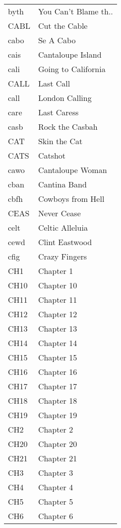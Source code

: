 \begin{supertabular}{ll}
 byth &  You Can't Blame th.. \\
 CABL &         Cut the Cable \\
 cabo &             Se A Cabo \\
 cais &     Cantaloupe Island \\
 cali &   Going to California \\
 CALL &             Last Call \\
 call &        London Calling \\
 care &           Last Caress \\
 casb &       Rock the Casbah \\
  CAT &          Skin the Cat \\
 CATS &               Catshot \\
 cawo &      Cantaloupe Woman \\
 cban &          Cantina Band \\
 cbfh &     Cowboys from Hell \\
 CEAS &           Never Cease \\
 celt &       Celtic Alleluia \\
 cewd &        Clint Eastwood \\
 cfig &         Crazy Fingers \\
  CH1 &             Chapter 1 \\
 CH10 &            Chapter 10 \\
 CH11 &            Chapter 11 \\
 CH12 &            Chapter 12 \\
 CH13 &            Chapter 13 \\
 CH14 &            Chapter 14 \\
 CH15 &            Chapter 15 \\
 CH16 &            Chapter 16 \\
 CH17 &            Chapter 17 \\
 CH18 &            Chapter 18 \\
 CH19 &            Chapter 19 \\
  CH2 &             Chapter 2 \\
 CH20 &            Chapter 20 \\
 CH21 &            Chapter 21 \\
  CH3 &             Chapter 3 \\
  CH4 &             Chapter 4 \\
  CH5 &             Chapter 5 \\
  CH6 &             Chapter 6 \\

\end{supertabular}
